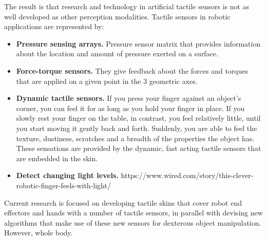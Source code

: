 The result is that research and technology in artificial tactile sensors is not as well developed as other perception modalities. Tactile sensors in robotic applications are represented by:

\begin{itemize}
    \item\textbf{Pressure sensing arrays.} Pressure sensor matrix that provides information about the location and amount of pressure exerted on a surface.
    \item\textbf{Force-torque sensors.} They give feedback about the forces and torques that are applied on a given point in the 3 geometric axes.
    \item\textbf{Dynamic tactile sensors.} If you press your finger against an object’s corner, you can feel it for as long as you hold your finger in place. If you slowly rest your finger on the table, in contrast, you feel relatively little, until you start moving it gently back and forth. Suddenly, you are able to feel the texture, dustiness, scratches and a breadth of the properties the object has. These sensations are provided by the dynamic, fast acting tactile sensors that are embedded in the skin.
    \item\textbf{Detect changing light levels.}  https://www.wired.com/story/this-clever-robotic-finger-feels-with-light/
\end{itemize}


Current research is focused on developing tactile skins that cover robot end effectors and hands with a number of tactile sensors, in parallel with devising new algorithms that make use of these new sensors for dexterous object manipulation. However, whole body.
